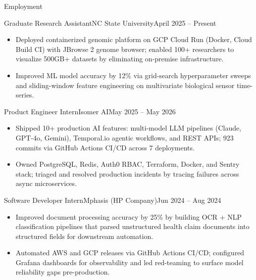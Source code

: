 \documentclass[]{mcdowellcv}
\begin{document}
\makeheader

\begin{cvsection}{Employment}
  \begin{cvsubsection}{Graduate Research Assistant}{NC State University}{April 2025 -- Present}
    \begin{itemize}
      \item Deployed containerized genomic platform on GCP Cloud Run (Docker, Cloud Build CI) with JBrowse 2 genome browser; enabled 100+ researchers to visualize 500GB+ datasets by eliminating on-premise infrastructure.
      \item Improved ML model accuracy by 12\% via grid-search hyperparameter sweeps and sliding-window feature engineering on multivariate biological sensor time-series.
    \end{itemize}
    \vspace{-1.5pt}
  \end{cvsubsection}

  \begin{cvsubsection}{Product Engineer Intern}{Isomer AI}{May 2025 -- May 2026}
    \begin{itemize}
      \item Shipped 10+ production AI features: multi-model LLM pipelines (Claude, GPT-4o, Gemini), Temporal.io agentic workflows, and REST APIs; 923 commits via GitHub Actions CI/CD across 7 deployments.
      \item Owned PostgreSQL, Redis, Auth0 RBAC, Terraform, Docker, and Sentry stack; triaged and resolved production incidents by tracing failures across async microservices.
    \end{itemize}
    \vspace{-1.5pt}
  \end{cvsubsection}

  \begin{cvsubsection}{Software Developer Intern}{Mphasis (HP Company)}{Jun 2024 -- Aug 2024}
    \begin{itemize}
      \item Improved document processing accuracy by 25\% by building OCR + NLP classification pipelines that parsed unstructured health claim documents into structured fields for downstream automation.
      \item Automated AWS and GCP releases via GitHub Actions CI/CD; configured Grafana dashboards for observability and led red-teaming to surface model reliability gaps pre-production.
    \end{itemize}
    \vspace{-1.5pt}
  \end{cvsubsection}


\end{cvsection}
\end{document}
